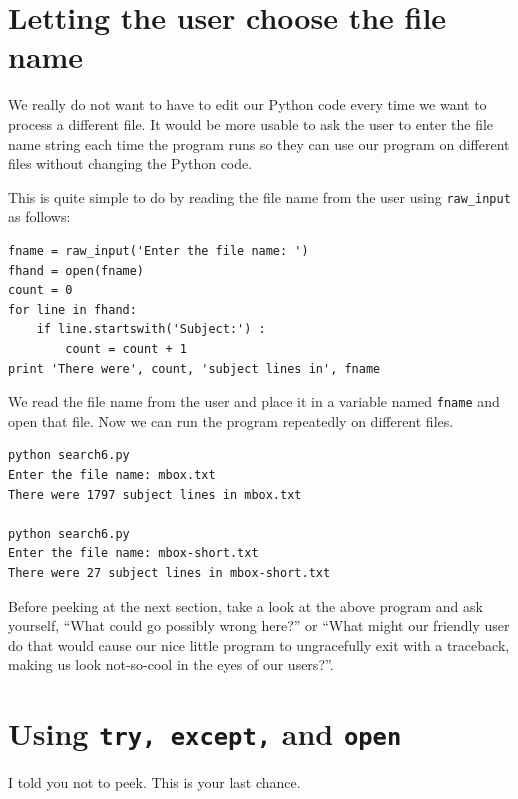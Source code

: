 \documentclass[10pt]{book}
\begin{document}
\section{Letting the user choose the file name}

We really do not want to have to edit our Python code
every time we want to process a different file.  It would 
be more usable to ask the user to enter the file name string 
each time the program runs so they can use our 
program on different files without changing the Python code.

This is quite simple to do by reading the file name from
the user using \verb"raw_input" as follows:

\beforeverb
\begin{verbatim}
fname = raw_input('Enter the file name: ')
fhand = open(fname)
count = 0
for line in fhand:
    if line.startswith('Subject:') :
        count = count + 1
print 'There were', count, 'subject lines in', fname
\end{verbatim}
\afterverb
%
We read the file name from the user and place it in a variable
named {\tt fname} and open that file.  Now we can run the program 
repeatedly on different files.

\beforeverb
\begin{verbatim}
python search6.py 
Enter the file name: mbox.txt
There were 1797 subject lines in mbox.txt

python search6.py 
Enter the file name: mbox-short.txt
There were 27 subject lines in mbox-short.txt
\end{verbatim}
\afterverb
%
Before peeking at the next section, take a look at the above program
and ask yourself, ``What could go possibly wrong here?'' or ``What might our
friendly user do that would cause our nice little program to 
ungracefully exit with a traceback, making us look not-so-cool 
in the eyes of our users?''.

\section{Using {\tt try, except,} and {\tt open}}

I told you not to peek.  This is your last chance.
\end{document}
